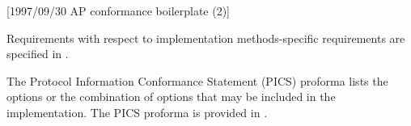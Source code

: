 [1997/09/30 AP conformance boilerplate (2)]

Requirements with respect to implementation methods-specific
requirements are specified in .

  The Protocol Information Conformance Statement (PICS)
proforma lists the options or the combination of options
that may be included in the implementation. The PICS
proforma is provided in .

\endinput
